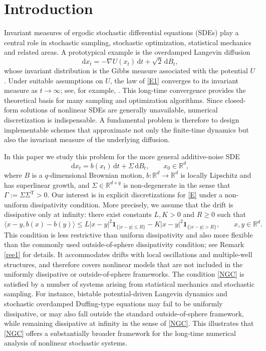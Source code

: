 \documentclass[aap]{imsart}
\theoremstyle{plain}
\theoremstyle{definition}
\begin{document}
\section{Introduction}
Invariant measures of ergodic stochastic differential equations (SDEs) play a central role in stochastic sampling, stochastic optimization, statistical mechanics and related areas. A prototypical example is the overdamped Langevin diffusion
\begin{equation}\label{E1}
	\mathrm d x_t=-\nabla U(x_t)\,\mathrm dt+\sqrt{2}\,\mathrm d B_t ,
\end{equation}
whose invariant distribution is the Gibbs measure associated with the potential $U$. Under suitable assumptions on $U$, the law of \eqref{E1} converges to its invariant measure as $t\to\infty$; see, for example, \cite{Meyn1993}. This long-time convergence provides the theoretical basis for many sampling and optimization algorithms. Since closed-form solutions of nonlinear SDEs are generally unavailable, numerical discretization is indispensable. A fundamental problem is therefore to design implementable schemes that approximate not only the finite-time dynamics but also the invariant measure of the underlying diffusion.


In this paper we study this problem for the more general additive-noise SDE
\begin{equation}\label{E}
	\mathrm d x_t=b(x_t)\,\mathrm dt+\Sigma\,\mathrm d B_t,\qquad x_0\in\mathbb R^d,
\end{equation}
where $B$ is a $q$-dimensional Brownian motion, $b:\mathbb R^d\to\mathbb R^d$ is locally Lipschitz and has superlinear growth, and $\Sigma\in\mathbb R^{d\times q}$ is non-degenerate in the sense that \(\Gamma:=\Sigma\Sigma^{\mathrm T}>0\).
Our interest is in explicit discretizations for \eqref{E} under a non-uniform dissipativity condition. More precisely, we assume that the drift is dissipative only at infinity: there exist constants $L,K>0$ and $R\geqslant 0$ such that
\begin{equation}\label{NGC}
	\langle x-y,b(x)-b(y)\rangle
	\leqslant L|x-y|^2\mathbf 1_{\{|x-y|\leqslant R\}}
	-K|x-y|^2\mathbf 1_{\{|x-y|>R\}},
	\qquad x,y\in\mathbb R^d .
\end{equation}
This condition is less restrictive than uniform dissipativity and also more flexible than the commonly used outside-of-sphere dissipativity condition; see Remark \ref{ree1} for details. It accommodates drifts with local oscillations and multiple-well structures, and therefore covers nonlinear models that are not included in the uniformly dissipative or outside-of-sphere frameworks. The condition \eqref{NGC} is satisfied by a number of systems arising from statistical mechanics and stochastic sampling. For instance, bistable potential-driven Langevin dynamics and stochastic overdamped Duffing-type equations \cite{McD} may fail to be uniformly dissipative, or may also fall outside the standard outside-of-sphere framework, while remaining dissipative at infinity in the sense of \eqref{NGC}. This illustrates that \eqref{NGC} offers a substantially broader framework for the long-time numerical analysis of nonlinear stochastic systems.
\end{document}

